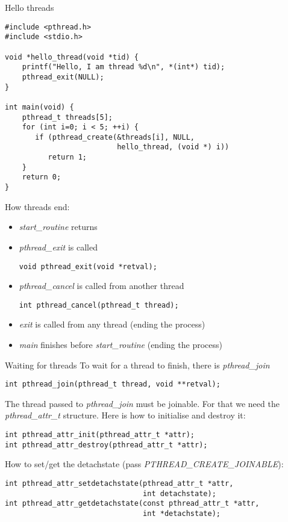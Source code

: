 \begin{frame}[fragile = singleslide]{Hello threads}
    \begin{lstlisting}
#include <pthread.h>
#include <stdio.h>

void *hello_thread(void *tid) {
    printf("Hello, I am thread %d\n", *(int*) tid);
    pthread_exit(NULL);
}

int main(void) {
    pthread_t threads[5];
    for (int i=0; i < 5; ++i) {
       if (pthread_create(&threads[i], NULL,
                          hello_thread, (void *) i))
          return 1;
    }
    return 0;
}

\end{lstlisting}
\end{frame}
\begin{frame}[fragile = singleslide]{How threads end:}
    \begin{itemize}
        \item \textit{start\_routine} returns
        \item \textit{pthread\_exit} is called
        \begin{lstlisting}[numbers=none]
void pthread_exit(void *retval);
\end{lstlisting}
        \item \textit{pthread\_cancel} is called from another thread
        \begin{lstlisting}[numbers=none]
int pthread_cancel(pthread_t thread);
\end{lstlisting}
        \item \textit{exit} is called from any thread (ending the process)
        \item \textit{main} finishes before \textit{start\_routine} (ending the process)
    \end{itemize}
\end{frame}
\begin{frame}[fragile = singleslide]{Waiting for threads}
    To wait for a thread to finish, there is \textit{pthread\_join}
    \begin{lstlisting}[numbers=none]
int pthread_join(pthread_t thread, void **retval);
\end{lstlisting}
   
    \bigskip
    The thread passed to \textit{pthread\_join} must be joinable. For that we need the
    \textit{pthread\_attr\_t} structure. Here is how to initialise and destroy it:\\
        \begin{lstlisting}[numbers=none]
int pthread_attr_init(pthread_attr_t *attr);
int pthread_attr_destroy(pthread_attr_t *attr);
\end{lstlisting}
    \bigskip
    How to set/get the detachstate (pass \textit{PTHREAD\_CREATE\_JOINABLE}):
    \begin{lstlisting}[numbers=none]
int pthread_attr_setdetachstate(pthread_attr_t *attr,
                                int detachstate);
int pthread_attr_getdetachstate(const pthread_attr_t *attr,
                                int *detachstate);
\end{lstlisting}
\end{frame}

